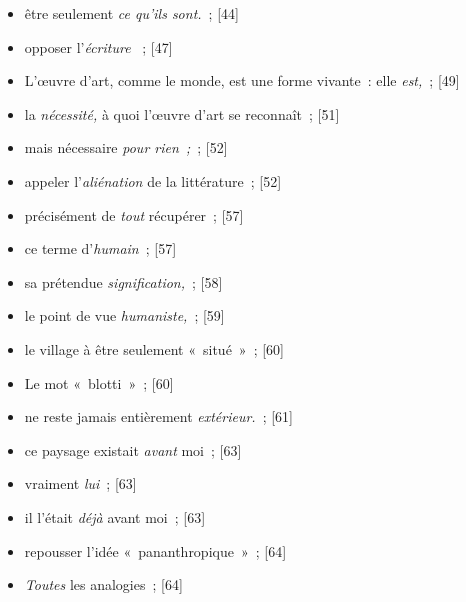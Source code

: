 \documentclass[12pt, a4paper]{article}
\begin{document}
\begin{itemize}
	\item être seulement \textit{ce qu’ils sont.}{\color{gray}~; [44]}

	\item opposer l’\textit{écriture }{\color{gray}~; [47]}

	\item L’œuvre d’art, comme le monde, est une forme vivante~: elle \textit{est,}{\color{gray}~; [49]}

	\item la \textit{nécessité,} à quoi l’œuvre d’art se reconnaît{\color{gray}~; [51]}

	\item mais nécessaire \textit{pour rien~;}{\color{gray}~; [52]}

	\item appeler l’\textit{aliénation} de la littérature{\color{gray}~; [52]}

	\item précisément de \textit{tout} récupérer{\color{gray}~; [57]}

	\item ce terme d’\textit{humain}{\color{gray}~; [57]}

	\item sa prétendue \textit{signification,}{\color{gray}~; [58]}

	\item le point de vue \textit{humaniste,}{\color{gray}~; [59]}

	\item le village à être seulement «~situé~»{\color{gray}~; [60]}

	\item Le mot «~blotti~»{\color{gray}~; [60]}

	\item ne reste jamais entièrement \textit{extérieur.}{\color{gray}~; [61]}

	\item ce paysage existait \textit{avant }moi{\color{gray}~; [63]}

	\item vraiment \textit{lui}{\color{gray}~; [63]}

	\item il l’était \textit{déjà }avant moi{\color{gray}~; [63]}

	\item  repousser l’idée «~pananthropique~»{\color{gray}~; [64]}

	\item \textit{Toutes} les analogies{\color{gray}~; [64]}


\end{itemize}
\end{document}
